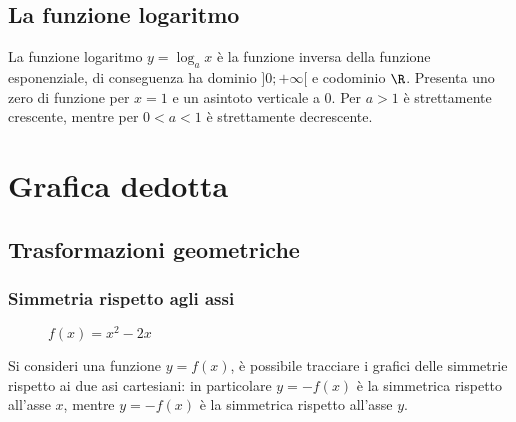\documentclass{article}     %
\begin{document}
    \subsection{La funzione logaritmo}
        La funzione logaritmo $y=\log_a x$ è la funzione inversa della funzione esponenziale, di conseguenza ha dominio $]0;+\infty[$ e codominio $\R$. Presenta uno zero di funzione per $x=1$ e un asintoto verticale a $0$. Per $a>1$ è strettamente crescente, mentre per $0<a<1$ è strettamente decrescente. 

    \section{Grafica dedotta}
    \subsection{Trasformazioni geometriche}
    \subsubsection{Simmetria rispetto agli assi}
    \begin{wrapfigure}[3]{r}{0.3\textwidth}
        \centering
        \caption*{$f(x)=x^2-2x$}
    \end{wrapfigure}
        Si consideri una funzione $y=f(x)$, è possibile tracciare i grafici delle simmetrie rispetto ai due asi cartesiani: in particolare $y=-f(x)$ è la simmetrica rispetto all'asse $x$, mentre $y=-f(x)$ è la simmetrica rispetto all'asse $y$.
\end{document}
